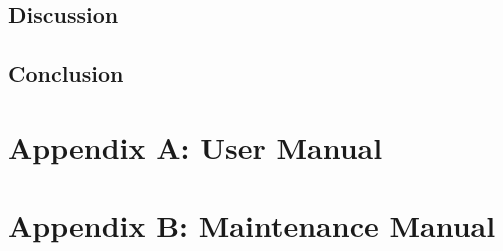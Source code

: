 \documentclass{pdfmx4020}
\begin{document}

  \section{Discussion} %
  \label{sec:discussion}
  

  \section{Conclusion} %
  \label{sec:conclusion}
  




\chapter*{Appendix A: User Manual}

\chapter*{Appendix B: Maintenance Manual}
\end{document}
